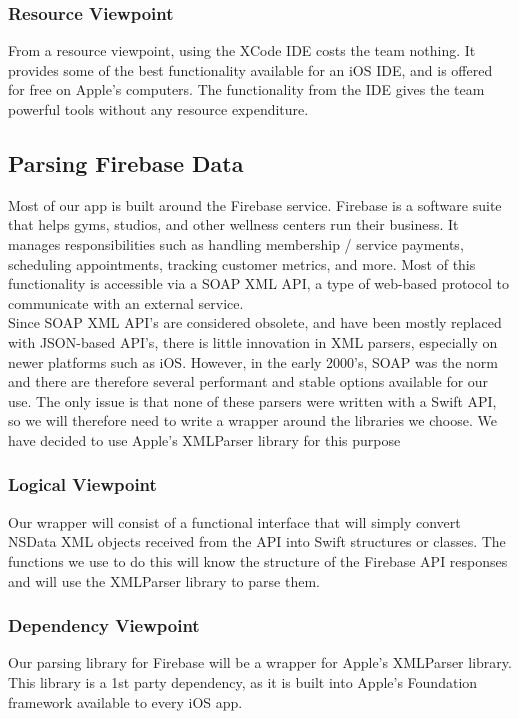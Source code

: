 \documentclass[letterpaper,10pt,titlepage]{article}
\begin{document}
\subsubsection{Resource Viewpoint}
From a resource viewpoint, using the XCode IDE costs the team nothing. It provides some of the best functionality available for an iOS IDE, and is offered for free on Apple’s computers. The functionality from the IDE gives the team powerful tools without any resource expenditure.

\subsection{Parsing Firebase Data}
Most of our app is built around the Firebase service. Firebase is a software suite that helps gyms, studios, and other wellness centers run their business. It manages responsibilities such as handling membership / service payments, scheduling appointments, tracking customer metrics, and more. Most of this functionality is accessible via a SOAP XML API, a type of web-based protocol to communicate with an external service.\\

Since SOAP XML API’s are considered obsolete, and have been mostly replaced with JSON-based API’s, there is little innovation in XML parsers, especially on newer platforms such as iOS. However, in the early 2000’s, SOAP was the norm and there are therefore several performant and stable options available for our use. The only issue is that none of these parsers were written with a Swift API, so we will therefore need to write a wrapper around the libraries we choose. We have decided to use Apple's XMLParser library for this purpose

\subsubsection{Logical Viewpoint}
Our wrapper will consist of a functional interface that will simply convert NSData XML objects received from the API into Swift structures or classes. The functions we use to do this will know the structure of the Firebase API responses and will use the XMLParser library to parse them.

\subsubsection{Dependency Viewpoint}
Our parsing library for Firebase will be a wrapper for Apple's XMLParser library. This library is a 1st party dependency, as it is built into Apple's Foundation framework available to every iOS app.
\end{document}
